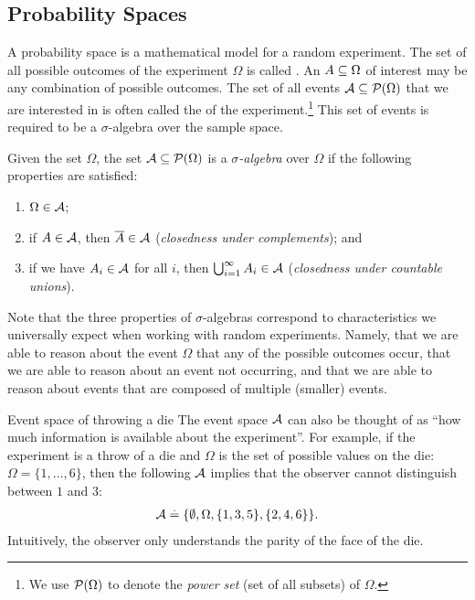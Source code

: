 \subsection{Probability Spaces}

A probability space is a mathematical model for a random experiment.
The set of all possible outcomes of the experiment $\Omega$ is called .
An  $A \subseteq \Omega$ of interest may be any combination of possible outcomes.
The set of all events $\spA \subseteq \pset{\Omega}$ that we are interested in is often called the  of the experiment.\footnote{We use $\pset{\Omega}$ to denote the \emph{power set} (set of all subsets) of $\Omega$.}
This set of events is required to be a $\sigma$-algebra over the sample space.

\begin{defn}
  Given the set $\Omega$, the set $\spA \subseteq \pset{\Omega}$ is a \emph{$\sigma$-algebra} over $\Omega$ if the following properties are satisfied: \begin{enumerate}
    \item $\Omega \in \mathcal{A}$;
    \item if $A \in \mathcal{A}$, then $\overline{A} \in \mathcal{A}$ (\emph{closedness under complements}); and
    \item if we have $A_i \in \mathcal{A}$ for all $i$, then $\bigcup_{i=1}^\infty A_i \in \mathcal{A}$ (\emph{closedness under countable unions}).
  \end{enumerate}
\end{defn}

Note that the three properties of $\sigma$-algebras correspond to characteristics we universally expect when working with random experiments.
Namely, that we are able to reason about the event $\Omega$ that any of the possible outcomes occur, that we are able to reason about an event not occurring, and that we are able to reason about events that are composed of multiple (smaller) events.

\begin{ex}{Event space of throwing a die}{}
  The event space $\mathcal{A}$ can also be thought of as ``how much information is available about the experiment''.
  For example, if the experiment is a throw of a die and $\Omega$ is the set of possible values on the die: ${\Omega = \{1, \dots, 6\}}$, then the following $\mathcal{A}$ implies that the observer cannot distinguish between $1$ and $3$: \begin{align*}
    \mathcal{A} \overset{.}{=} \{\emptyset, \Omega, \{1, 3, 5\}, \{2, 4, 6\}\}.
  \end{align*}
  Intuitively, the observer only understands the parity of the face of the die.
\end{ex}

